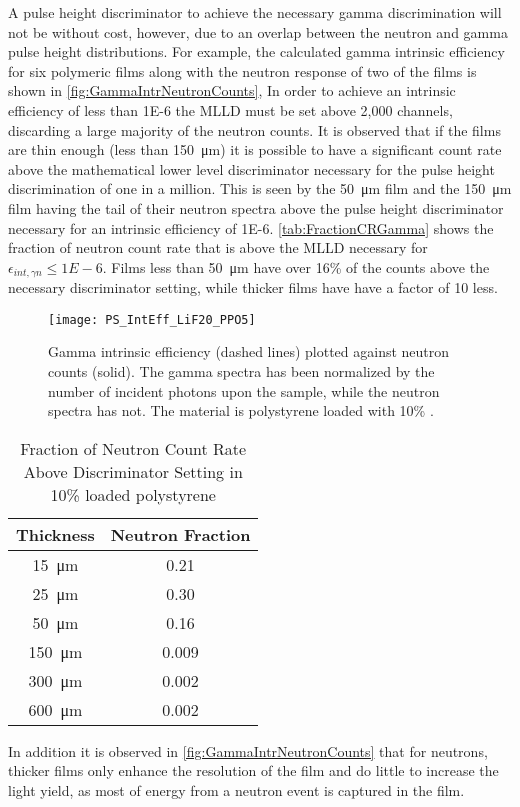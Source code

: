 A pulse height discriminator to achieve the necessary gamma discrimination will not be without cost, however, due to an overlap between the neutron and gamma pulse height distributions.
For example, the calculated gamma intrinsic efficiency for six polymeric films along with the neutron response of two of the films is shown in \autoref{fig:GammaIntrNeutronCounts},
In order to achieve an intrinsic efficiency of less than \num{1E-6} the MLLD must be set above 2,000 channels, discarding a large majority of the neutron counts.
It is observed that if the films are thin enough (less than \SI{150}{\um}) it is possible to have a significant count rate above the mathematical lower level discriminator necessary for the pulse height discrimination of one in a million.
This is seen by the \SI{50}{\um} film and the \SI{150}{\um} film having the tail of their neutron spectra above the pulse height discriminator necessary for an intrinsic efficiency of \num{1E-6}.
\autoref{tab:FractionCRGamma} shows the fraction of neutron count rate that is above the MLLD necessary for $\epsilon_{int,\gamma n} \le \si{1E-6}$.
Films less than \SI{50}{\um} have over 16\% of the counts above the necessary discriminator setting, while thicker films have have a factor of 10 less.
\begin{figure}[ht]
    \centering
    \texttt{[image: PS\_IntEff\_LiF20\_PPO5]}
    \caption[PS Gamma intrinsic efficiency and neutron count rate]{Gamma intrinsic efficiency (dashed lines) plotted against neutron counts (solid). The gamma spectra has been normalized by the number of incident photons upon the sample, while the neutron spectra has not. The material is polystyrene loaded with 10\% .}
    \label{fig:GammaIntrNeutronCounts}
\end{figure}
\begin{table}
    \caption{Fraction of Neutron Count Rate Above Discriminator Setting in 10\% loaded polystyrene}
	\centering
	\begin{tabular}{c | c}
  \toprule
	Thickness & Neutron Fraction \\
	\midrule
  \SI{15}{\um} & 0.21 \\
	\SI{25}{\um} & 0.30 \\
	\SI{50}{\um}  & 0.16 \\
	\SI{150}{\um}  & 0.009 \\
	\SI{300}{\um}  & 0.002 \\
	\SI{600}{\um}  & 0.002 \\
  \bottomrule
	\end{tabular}
  \label{tab:FractionCRGamma}
\end{table}
In addition it is observed in \autoref{fig:GammaIntrNeutronCounts} that for neutrons, thicker films only enhance the resolution of the film and do little to increase the light yield, as most of energy from a neutron event is captured in the film.
